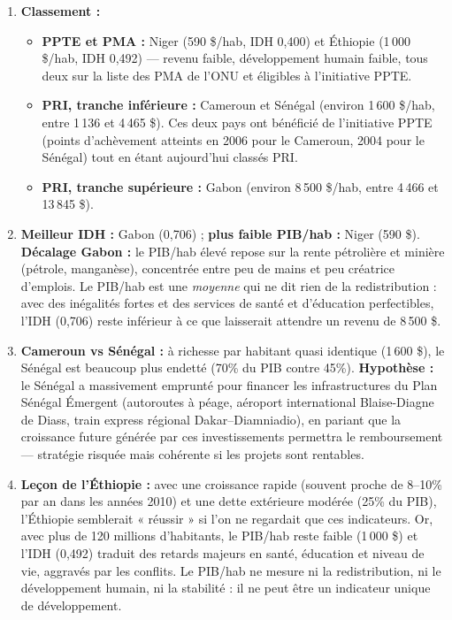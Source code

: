 \documentclass[11pt]{article}
\begin{document}
\begin{corrige}
\begin{enumerate}
\item \textbf{Classement :}
\begin{itemize}
\item \textbf{PPTE et PMA :} Niger (590 \$/hab, IDH 0,400) et Éthiopie (1\,000 \$/hab, IDH 0,492) — revenu faible, développement humain faible, tous deux sur la liste des PMA de l'ONU et éligibles à l'initiative PPTE.
\item \textbf{PRI, tranche inférieure :} Cameroun et Sénégal (environ 1\,600 \$/hab, entre 1\,136 et 4\,465 \$). Ces deux pays ont bénéficié de l'initiative PPTE (points d'achèvement atteints en 2006 pour le Cameroun, 2004 pour le Sénégal) tout en étant aujourd'hui classés PRI.
\item \textbf{PRI, tranche supérieure :} Gabon (environ 8\,500 \$/hab, entre 4\,466 et 13\,845 \$).
\end{itemize}
\item \textbf{Meilleur IDH :} Gabon (0,706) ; \textbf{plus faible PIB/hab :} Niger (590 \$). \textbf{Décalage Gabon :} le PIB/hab élevé repose sur la rente pétrolière et minière (pétrole, manganèse), concentrée entre peu de mains et peu créatrice d'emplois. Le PIB/hab est une \emph{moyenne} qui ne dit rien de la redistribution : avec des inégalités fortes et des services de santé et d'éducation perfectibles, l'IDH (0,706) reste inférieur à ce que laisserait attendre un revenu de 8\,500 \$.
\item \textbf{Cameroun vs Sénégal :} à richesse par habitant quasi identique (1\,600 \$), le Sénégal est beaucoup plus endetté (70\% du PIB contre 45\%). \textbf{Hypothèse :} le Sénégal a massivement emprunté pour financer les infrastructures du Plan Sénégal Émergent (autoroutes à péage, aéroport international Blaise-Diagne de Diass, train express régional Dakar--Diamniadio), en pariant que la croissance future générée par ces investissements permettra le remboursement — stratégie risquée mais cohérente si les projets sont rentables.
\item \textbf{Leçon de l'Éthiopie :} avec une croissance rapide (souvent proche de 8--10\% par an dans les années 2010) et une dette extérieure modérée (25\% du PIB), l'Éthiopie semblerait « réussir » si l'on ne regardait que ces indicateurs. Or, avec plus de 120 millions d'habitants, le PIB/hab reste faible (1\,000 \$) et l'IDH (0,492) traduit des retards majeurs en santé, éducation et niveau de vie, aggravés par les conflits. Le PIB/hab ne mesure ni la redistribution, ni le développement humain, ni la stabilité : il ne peut être un indicateur unique de développement.
\end{enumerate}
\end{corrige}
\end{document}
